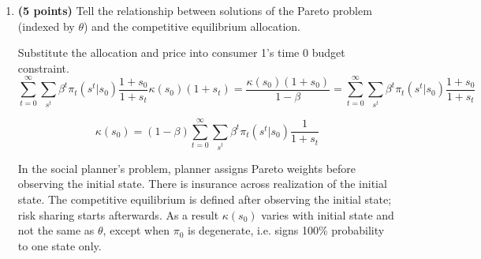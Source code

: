 \documentclass[12pt, oneside]{article}
\begin{document}
\begin{enumerate}
\begin{enumerate}
If $s_0=0$, $q^0_t(s^t|s_0=0) = \beta^t \pi_t(s^t|s_0=0) \frac{1}{1+s_t}$. 

If $s_0=1$, $q^0_t(s^t|s_0=1) = \beta^t \pi_t(s^t|s_0=1) \frac{2}{1+s_t}$. 

\item \textbf{(5 points)} Tell the relationship between solutions of the Pareto problem  (indexed by $\theta$) and the competitive
equilibrium allocation.

Substitute the allocation and price into consumer 1's time 0 budget constraint.
\[  \sum_{t=0}^\infty \sum_{s^t} \beta^t \pi_t(s^t|s_0) \frac{1+s_0}{1+s_t} \kappa(s_0) (1+s_t) =\frac{\kappa(s_0)(1+s_0)}{1-\beta} =\sum_{t=0}^\infty \sum_{s^t} \beta^t \pi_t(s^t|s_0) \frac{1+s_0}{1+s_t} \]

\[ \kappa(s_0) = (1-\beta)\sum_{t=0}^\infty \sum_{s^t} \beta^t \pi_t(s^t|s_0) \frac{1}{1+s_t} \]

In the social planner's problem, planner assigns Pareto weights before observing the initial state. There is insurance across realization of the initial state. The competitive equilibrium is defined after observing the initial state; risk sharing starts afterwards. As a result $\kappa(s_0)$ varies with initial state and not the same as $\theta$, except when $\pi_0$ is degenerate, i.e. signs 100\% probability to one state only. 

\end{enumerate}

\end{enumerate}
\end{document}
